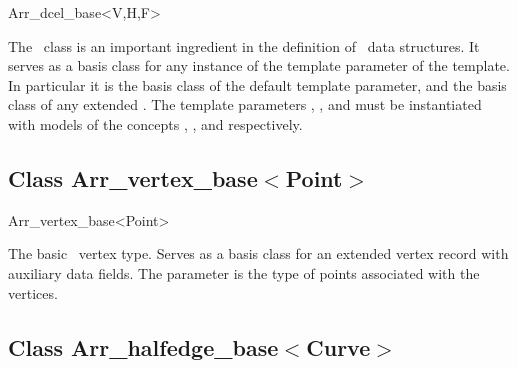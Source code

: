 
\ccRefPageBegin

\begin{ccRefClass}{Arr_dcel_base<V,H,F>}
\label{arr_ref:arr_dcel_base}
    
\ccDefinition

The \ccClassTemplateName\ class is an important ingredient in the
definition of \dcel\ data structures. It serves as a basis class for
any instance of the  template parameter of the
 template. In particular it is the basis class of
the default  template parameter, and the basis class of any
extended \dcel. The template parameters , , and 
must be instantiated with models of the concepts
, ,
and  respectively.

 
\ccIsModel


\subsection*{Class Arr\_vertex\_base$<$Point$>$}

\begin{ccClass}{Arr_vertex_base<Point>}

\ccDefinition

The basic \dcel\ vertex type. Serves as a basis class for an extended
vertex record with auxiliary data fields. The  parameter is
the type of points associated with the vertices.

\ccIsModel

\end{ccClass}


\subsection*{Class Arr\_halfedge\_base$<$Curve$>$}


\end{ccRefClass}
